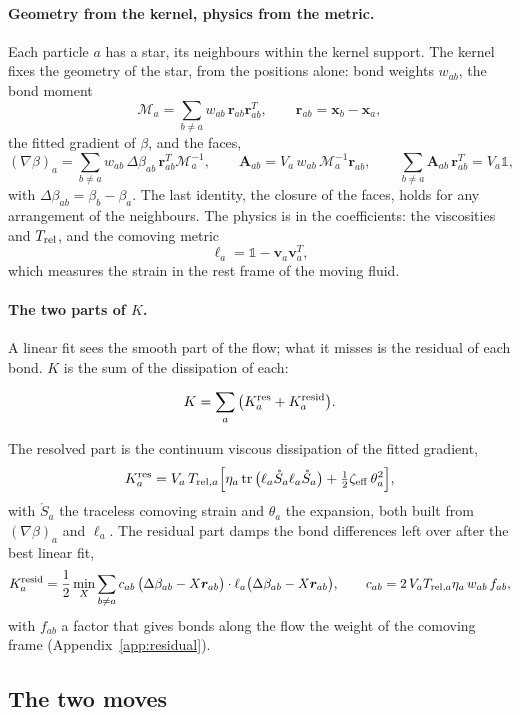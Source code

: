 \documentclass[11pt,aps,preprint,nofootinbib,superscriptaddress,tightenlines]{revtex4-2}
\newcommand{\one}{\mathds{1}}
\def\st{\begin{equation}}
\def\stp{\end{equation}}
\def\App#1{Appendix~\ref{#1}}
\def\tr{\operatorname{tr}}
\let\oldparagraph\paragraph
\renewcommand{\paragraph}{\par\bigskip\oldparagraph}
\begin{document}
\paragraph{Geometry from the kernel, physics from the metric.}  Each particle $a$ has a star, its neighbours within the kernel support.  The
kernel fixes the geometry of the star, from the positions alone: bond weights $w_{ab}$, the bond moment
\st
\mathcal M_a=\sum_{b\neq a}w_{ab}\,\bm r_{ab}\bm r_{ab}^T,\qquad \bm r_{ab}=\bm x_b-\bm x_a ,
\stp
the fitted gradient of $\beta$, and the faces,
\st
(\nabla\beta)_a=\sum_{b\neq a}w_{ab}\,\Delta\beta_{ab}\,\bm r_{ab}^T\mathcal M_a^{-1},\qquad
\bm A_{ab}=V_a\,w_{ab}\,\mathcal M_a^{-1}\bm r_{ab},\qquad
\sum_{b\neq a}\bm A_{ab}\,\bm r_{ab}^T=V_a\one ,
\label{faces}
\stp
with $\Delta\beta_{ab}=\beta_b-\beta_a$.  The last identity, the closure of the faces, holds for any arrangement of the neighbours.  The physics is in
the coefficients: the viscosities and $T_{\rm rel}$, and the comoving metric
\st
\ell_a=\one-\bm v_a\bm v_a^T ,
\stp
which measures the strain in the rest frame of the moving fluid.

\paragraph{The two parts of $K$.}  A linear fit sees the smooth part of the flow; what it misses is the residual of each bond.  $K$ is the sum of
the dissipation of each:
\begin{keyeq}
\st
K=\sum_a\big(K_a^{\rm res}+K_a^{\rm resid}\big).
\stp
\end{keyeq}
The resolved part is the continuum viscous dissipation of the fitted gradient,
\st
K_a^{\rm res}=V_a\,T_{{\rm rel},a}\Big[\eta_a\tr\big(\ell_a\mathring S_a\ell_a\mathring S_a\big)+\tfrac12\zeta_{\rm eff}\,\theta_a^2\Big],
\stp
with $\mathring S_a$ the traceless comoving strain and $\theta_a$ the expansion, both built from $(\nabla\beta)_a$ and $\ell_a$.  The residual part damps the
bond differences left over after the best linear fit,
\st
K_a^{\rm resid}=\frac12\min_X\sum_{b\neq a}c_{ab}\,\big(\Delta\beta_{ab}-X\bm r_{ab}\big)\cdot\ell_a\big(\Delta\beta_{ab}-X\bm r_{ab}\big),
\qquad c_{ab}=2\,V_aT_{{\rm rel},a}\eta_a\,w_{ab}\,f_{ab} ,
\stp
with $f_{ab}$ a factor that gives bonds along the flow the weight of the comoving frame (\App{app:residual}).

\subsection{The two moves}
\end{document}
